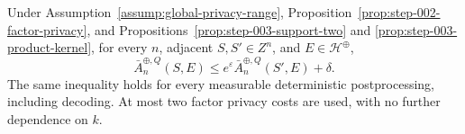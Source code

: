 \begin{proposition}
\label{prop:step-003-joint-composition}
Under Assumption~\ref{assump:global-privacy-range},
Proposition~\ref{prop:step-002-factor-privacy}, and
Propositions~\ref{prop:step-003-support-two} and
\ref{prop:step-003-product-kernel}, for every \(n\), adjacent
\(S,S'\in Z^n\), and \(E\in\mathscr H^{\oplus}\),
\begin{equation}\label{eq:step-003-global-dp}
\bar A_n^{\oplus,Q}(S,E)
\le e^\varepsilon\bar A_n^{\oplus,Q}(S',E)+\delta.
\end{equation}
The same inequality holds for every measurable deterministic
postprocessing, including decoding.  At most two factor privacy costs are
used, with no further dependence on \(k\).
\end{proposition}

